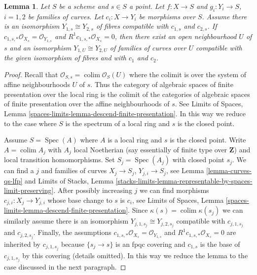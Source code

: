 \documentclass{stacks-project}
\theoremstyle{plain}
\newtheorem{lemma}[subsection]{Lemma}
\theoremstyle{definition}
\theoremstyle{remark}
\numberwithin{equation}{subsection}
\def\colim{\mathop{\mathrm{colim}}\nolimits}
\def\Spec{\mathop{\mathrm{Spec}}}
\begin{document}
\begin{lemma}
\label{lemma-contract-basic-uniqueness}
Let $S$ be a scheme and $s \in S$ a point.
Let $f : X \to S$ and $g_i : Y_i \to S$, $i = 1, 2$ be families of curves.
Let $c_i : X \to Y_i$ be morphisms over $S$.
Assume there is an isomorphism $Y_{1, s} \cong Y_{2, s}$
of fibres compatible with $c_{1, s}$ and $c_{2, s}$.
If $c_{1, s, *}\mathcal{O}_{X_s} = \mathcal{O}_{Y_{1, s}}$ and
$R^1c_{1, s, *}\mathcal{O}_{X_s} = 0$, then there exist an
open neighbourhood $U$ of $s$ and an isomorphism
$Y_{1, U} \cong Y_{2, U}$ of families of curves over $U$
compatible with the given isomorphism of fibres and with
$c_1$ and $c_2$.
\end{lemma}

\begin{proof}
Recall that $\mathcal{O}_{S, s} = \colim \mathcal{O}_S(U)$ where
the colimit is over the system of affine neighbourhoods $U$ of $s$.
Thus the category of algebraic spaces of finite presentation over
the local ring is the colimit of the categories of algebraic spaces
of finite presentation over the affine neighbourhoods of $s$.
See Limits of Spaces, Lemma
\ref{spaces-limits-lemma-descend-finite-presentation}.
In this way we reduce to the case where $S$ is the spectrum of
a local ring and $s$ is the closed point.

\medskip\noindent
Assume $S = \Spec(A)$ where $A$ is a local ring and $s$ is the closed point.
Write $A = \colim A_j$ with $A_j$ local Noetherian (say essentially
of finite type over $\mathbf{Z}$) and local transition homomorphisms.
Set $S_j = \Spec(A_j)$ with closed point $s_j$. We can find a
$j$ and families of curves $X_j \to S_j$, $Y_{j, i} \to S_j$,
see Lemma \ref{lemma-curves-qs-lfp} and
Limits of Stacks, Lemma
\ref{stacks-limits-lemma-representable-by-spaces-limit-preserving}.
After possibly increasing $j$ we can find morphisms
$c_{j, i} : X_j \to Y_{j, i}$ whose base change to $s$ is $c_i$, see
Limits of Spaces, Lemma
\ref{spaces-limits-lemma-descend-finite-presentation}.
Since $\kappa(s) = \colim \kappa(s_j)$ we can similarly
assume there is an isomorphism $Y_{j, 1, s_j} \cong Y_{j, 2, s_j}$
compatible with $c_{j, 1, s_j}$ and $c_{j, 2, s_j}$.
Finally, the assumptions
$c_{1, s, *}\mathcal{O}_{X_s} = \mathcal{O}_{Y_{1, s}}$ and
$R^1c_{1, s, *}\mathcal{O}_{X_s} = 0$
are inherited by $c_{j, 1, s_j}$ because
$\{s_j \to s\}$ is an fpqc covering and
$c_{1, s}$ is the base of $c_{j, 1, s_j}$ by this covering (details omitted).
In this way we reduce the lemma to the case discussed in the next paragraph.


\end{proof}
\end{document}
